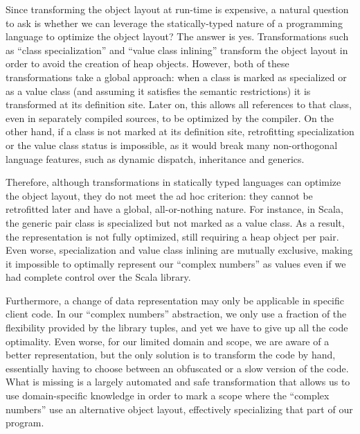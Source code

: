 
Since transforming the object layout at run-time is expensive, a
natural question to ask is whether we can leverage the
statically-typed nature of a programming language to optimize the
object layout? The answer is yes. Transformations such as ``class
specialization'' and ``value class inlining'' transform the object
layout in order to avoid the creation of heap objects. However, both
of these transformations take a global approach: when a class is
marked as specialized or as a value class (and assuming it satisfies the
semantic restrictions) it is transformed at its definition site. Later
on, this allows all references to that class, even in separately
compiled sources, to be optimized by the compiler. On the other hand,
if a class is not marked at its definition site, retrofitting
specialization or the value class status is impossible, as it would
break many non-orthogonal language features, such as dynamic dispatch,
inheritance and generics.

Therefore, although transformations in statically typed languages can
optimize the object layout, they do not meet the ad hoc criterion:
they cannot be retrofitted later and have a global, all-or-nothing
nature. For instance, in Scala, the generic pair class is specialized
but not marked as a value class. As a result, the representation is
not fully optimized, still requiring a heap object per pair. Even
worse, specialization and value class inlining are mutually exclusive,
making it impossible to optimally represent our ``complex numbers''
as values even if we had complete control over the Scala library.

Furthermore, a change of data representation may only be applicable in
specific client code. In our ``complex numbers'' abstraction, we only
use a fraction of the flexibility provided by the library tuples, and
yet we have to give up all the code optimality. Even worse, for our
limited domain and scope, we are aware of a better representation, but
the only solution is to transform the code by hand, essentially having
to choose between an obfuscated or a slow version of the code. What is
missing is a largely automated and safe transformation that allows us
to use domain-specific knowledge in order to mark a scope where the
``complex numbers'' use an alternative object layout, effectively
specializing that part of our program.


